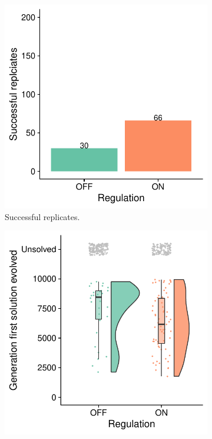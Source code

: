 
\begin{figure}[ht]
\centering

\begin{subfigure}[b]{0.45\textwidth}
    \centering
    \includegraphics[width=\linewidth]{chapters/05-tag-based-genetic-regulation/media/boolean-calc-prefix-solution-counts.pdf}
    \caption{\small Successful replicates.}
    \label{chapter:tag-based-regulation:subfig:boolean-calc-prefix-solution-count}
\end{subfigure}
\hfill
\begin{subfigure}[b]{0.45\textwidth}
    \centering
    \includegraphics[width=\textwidth]{chapters/05-tag-based-genetic-regulation/media/boolean-calc-prefix-solve-time-cloud.pdf}

\end{subfigure}
\end{figure}
